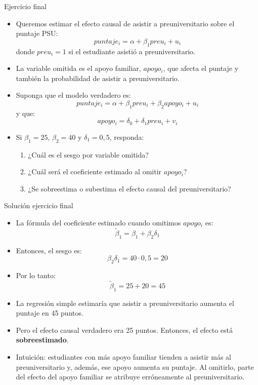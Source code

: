 \documentclass[10pt,aspectratio=169]{beamer}
\begin{document}
\begin{frame}{Ejercicio final}
    \begin{itemize}
        \item Queremos estimar el efecto causal de asistir a preuniversitario sobre el puntaje PSU:
        $$
        puntaje_i=\alpha+\beta_1 preu_i+u_i
        $$
        donde $preu_i=1$ si el estudiante asistió a preuniversitario.
        \item La variable omitida es el apoyo familiar, $apoyo_i$, que afecta el puntaje y también la probabilidad de asistir a preuniversitario.
        \item Suponga que el modelo verdadero es:
        $$
        puntaje_i=\alpha+\beta_1 preu_i+\beta_2 apoyo_i+u_i
        $$
        y que:
        $$
        apoyo_i=\delta_0+\delta_1 preu_i+v_i
        $$
        \item Si $\beta_1=25$, $\beta_2=40$ y $\delta_1=0{,}5$, responda:
        \begin{enumerate}
            \item ¿Cuál es el sesgo por variable omitida?
            \item ¿Cuál será el coeficiente estimado al omitir $apoyo_i$?
            \item ¿Se sobreestima o subestima el efecto causal del preuniversitario?
        \end{enumerate}
    \end{itemize}
\end{frame}

\begin{frame}{Solución ejercicio final}
    \begin{itemize}
        \item La fórmula del coeficiente estimado cuando omitimos $apoyo_i$ es:
        $$
        \tilde{\beta}_{1}=\beta_1+\beta_2\delta_1
        $$
        \item Entonces, el sesgo es:
        $$
        \beta_2\delta_1=40\cdot 0{,}5=20
        $$
        \item Por lo tanto:
        $$
        \tilde{\beta}_{1}=25+20=45
        $$
        \item La regresión simple estimaría que asistir a preuniversitario aumenta el puntaje en 45 puntos.
        \item Pero el efecto causal verdadero era 25 puntos. Entonces, el efecto está \textbf{sobreestimado}.
        \item Intuición: estudiantes con más apoyo familiar tienden a asistir más al preuniversitario y, además, ese apoyo aumenta su puntaje. Al omitirlo, parte del efecto del apoyo familiar se atribuye erróneamente al preuniversitario.
    \end{itemize}
\end{frame}
\end{document}
